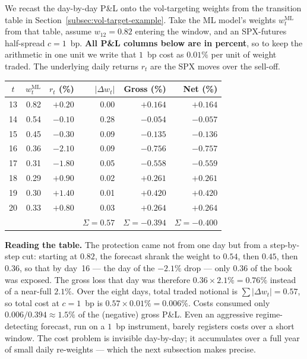 \begin{workedexample}
We recast the day-by-day P\&L onto the vol-targeting weights from the transition table in Section~\ref{subsec:vol-target-example}. Take the ML model's weights $w_t^{\text{ML}}$ from that table, assume $w_{12} = 0.82$ entering the window, and an SPX-futures half-spread $c = 1$~bp. \textbf{All P\&L columns below are in percent}, so to keep the arithmetic in one unit we write that $1$~bp cost as $0.01\%$ per unit of weight traded. The underlying daily returns $r_t$ are the SPX moves over the sell-off.

\medskip
\begin{center}
\begin{tabular}{crrrrr}
\toprule
$t$ & $w_t^{\text{ML}}$ & $r_t$ (\%) & $|\Delta w_t|$ & Gross (\%) & Net (\%) \\
\midrule
13 & 0.82 & $+0.20$ & 0.00 & $+0.164$ & $+0.164$ \\
14 & 0.54 & $-0.10$ & 0.28 & $-0.054$ & $-0.057$ \\
15 & 0.45 & $-0.30$ & 0.09 & $-0.135$ & $-0.136$ \\
16 & 0.36 & $-2.10$ & 0.09 & $-0.756$ & $-0.757$ \\
17 & 0.31 & $-1.80$ & 0.05 & $-0.558$ & $-0.559$ \\
18 & 0.29 & $+0.90$ & 0.02 & $+0.261$ & $+0.261$ \\
19 & 0.30 & $+1.40$ & 0.01 & $+0.420$ & $+0.420$ \\
20 & 0.33 & $+0.80$ & 0.03 & $+0.264$ & $+0.264$ \\
\midrule
   &      &         & $\Sigma = 0.57$ & $\Sigma = -0.394$ & $\Sigma = -0.400$ \\
\bottomrule
\end{tabular}
\end{center}

\medskip
\noindent\textbf{Reading the table.} The protection came not from one day but from a step-by-step cut: starting at $0.82$, the forecast shrank the weight to $0.54$, then $0.45$, then $0.36$, so that by day~16 --- the day of the $-2.1\%$ drop --- only $0.36$ of the book was exposed. The gross loss that day was therefore $0.36 \times 2.1\% = 0.76\%$ instead of a near-full $2.1\%$. Over the eight days, total traded notional is $\sum|\Delta w_t| = 0.57$, so total cost at $c = 1$~bp is $0.57 \times 0.01\% = 0.006\%$. Costs consumed only $0.006/0.394 \approx 1.5\%$ of the (negative) gross P\&L. Even an aggressive regime-detecting forecast, run on a $1$~bp instrument, barely registers costs over a short window. The cost problem is invisible day-by-day; it accumulates over a full year of small daily re-weights --- which the next subsection makes precise.
\end{workedexample}

